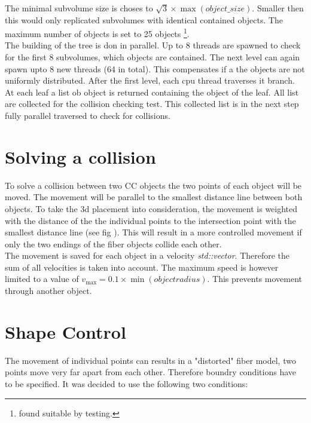 % 
The minimal subvolume size is choses to $\sqrt{3} \times \max(\mathit{object\_size})$.
Smaller then this would only replicated subvolumes with identical contained objects.
The maximum number of objects is set to \num{25} objects \footnote{found suitable by testing.}. \\
% 
The building of the tree is don in parallel.
Up to 8 threads are spawned to check for the first 8 subvolumes, which objects are contained.
The next level can again spawn upto 8 new threads (64 in total).
This compensates if a the objects are not uniformly distributed.
After the first level, each cpu thread traverses it branch.
At each leaf a list ob object is returned containing the object of the leaf.
All list are collected for the collision checking test.
This collected list is in the next step fully parallel traversed to check for collisions.
% 
\section{Solving a collision}
To solve a collision between two \ac{CC} objects the two points of each object will be moved.
The movement will be parallel to the smallest distance line between both objects.
To take the 3d placement into consideration, the movement is weighted with the distance of the the individual points to the intersection point with the smallest distance line (see fig \dummy).
This will result in a more controlled movement if \eg only the two endings of the fiber objects collide each other. \\
% 
The movement is saved for each object in a velocity \textit{std::vector}.
Therefore the sum of all velocities is taken into account.
The maximum speed is however limited to a value of $v_{\max} = 0.1 \times \min(\mathit{object radius})$.
This prevents movement through another object.
% 
\section{Shape Control}\label{chap5:ShapeControl}
The movement of individual points can results in a "distorted" fiber model, \eg two points move very far apart from each other.
Therefore boundry conditions have to be specified.
It was decided to use the following two conditions:
% 
